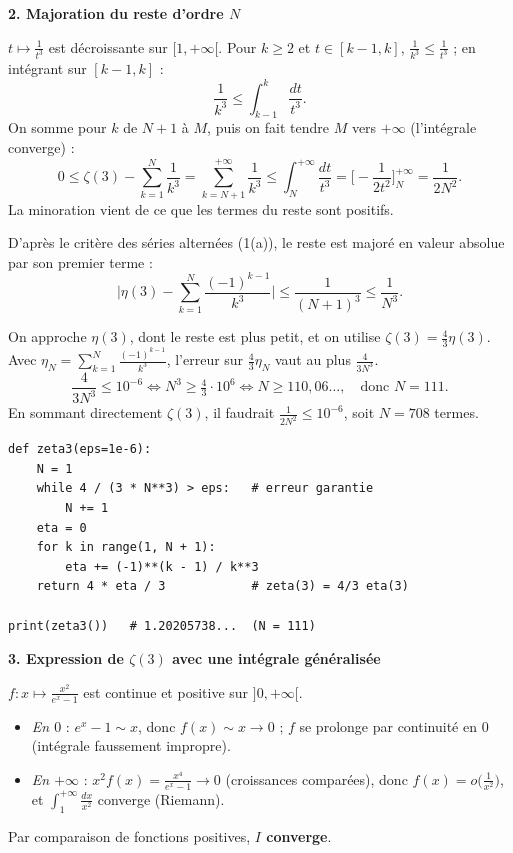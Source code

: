 \documentclass[a4paper,11pt]{article}
\numberwithin{equation}{section}
\numberwithin{figure}{section}
\numberwithin{table}{section}
\theoremstyle{enonce}
\theoremstyle{exemple}
\theoremstyle{remarque}
\newcommand{\Partie}[1]{\par\needspace{5\baselineskip}\vspace{1.1em}\noindent
  {\sffamily\bfseries\large\color{Bleu}#1}\par\vspace{2pt}{\color{Filet}\rule{\linewidth}{0.4pt}}\par\smallskip}
\newcommand{\Q}[1]{\par\needspace{3\baselineskip}\medskip\noindent{\sffamily\bfseries\color{Bleu}#1}\enspace}
\begin{document}
\Partie{2. Majoration du reste d'ordre $N$}

\Q{2(a)} $t\mapsto\frac1{t^3}$ est décroissante sur $[1,+\infty[$. Pour $k\geq2$ et $t\in[k-1,k]$, $\frac1{k^3}\leq\frac1{t^3}$ ; en
intégrant sur $[k-1,k]$ :
\[\frac1{k^3}\leq\int_{k-1}^{k}\frac{dt}{t^3}.\]
On somme pour $k$ de $N+1$ à $M$, puis on fait tendre $M$ vers $+\infty$ (l'intégrale converge) :
\[0\leq\zeta(3)-\sum_{k=1}^{N}\frac1{k^3}=\sum_{k=N+1}^{+\infty}\frac1{k^3}\leq\int_N^{+\infty}\frac{dt}{t^3}=\Big[-\frac1{2t^2}\Big]_N^{+\infty}=\frac1{2N^2}.\]
La minoration vient de ce que les termes du reste sont positifs.

\Q{2(b)} D'après le critère des séries alternées (1(a)), le reste est majoré en valeur absolue par son premier terme :
\[\Big|\eta(3)-\sum_{k=1}^{N}\frac{(-1)^{k-1}}{k^3}\Big|\leq\frac1{(N+1)^3}\leq\frac1{N^3}.\]

\Q{2(c)} On approche $\eta(3)$, dont le reste est plus petit, et on utilise $\zeta(3)=\frac43\eta(3)$.
Avec $\eta_N=\sum_{k=1}^N\frac{(-1)^{k-1}}{k^3}$, l'erreur sur $\frac43\eta_N$ vaut au plus $\frac4{3N^3}$.
\[\frac4{3N^3}\leq10^{-6}\iff N^3\geq\tfrac43\cdot10^6\iff N\geq110{,}06\ldots,\quad\text{donc } N=111 .\]
En sommant directement $\zeta(3)$, il faudrait $\frac1{2N^2}\leq10^{-6}$, soit $N=708$ termes.
\begin{center}
\begin{minipage}{0.8\linewidth}\small
\begin{verbatim}
def zeta3(eps=1e-6):
    N = 1
    while 4 / (3 * N**3) > eps:   # erreur garantie
        N += 1
    eta = 0
    for k in range(1, N + 1):
        eta += (-1)**(k - 1) / k**3
    return 4 * eta / 3            # zeta(3) = 4/3 eta(3)

print(zeta3())   # 1.20205738...  (N = 111)
\end{verbatim}
\end{minipage}
\end{center}

\Partie{3. Expression de $\zeta(3)$ avec une intégrale généralisée}

\Q{3(a)} $f:x\mapsto\frac{x^2}{e^x-1}$ est continue et positive sur $]0,+\infty[$.
\begin{itemize}[leftmargin=1.2em,itemsep=2pt,topsep=2pt]
\item \emph{En $0$} : $e^x-1\sim x$, donc $f(x)\sim x\to0$ ; $f$ se prolonge par continuité en $0$ (intégrale faussement impropre).
\item \emph{En $+\infty$} : $x^2f(x)=\frac{x^4}{e^x-1}\to0$ (croissances comparées), donc $f(x)=o\big(\frac1{x^2}\big)$, et
$\int_1^{+\infty}\frac{dx}{x^2}$ converge (Riemann).
\end{itemize}
Par comparaison de fonctions positives, \textbf{$I$ converge}.
\end{document}
